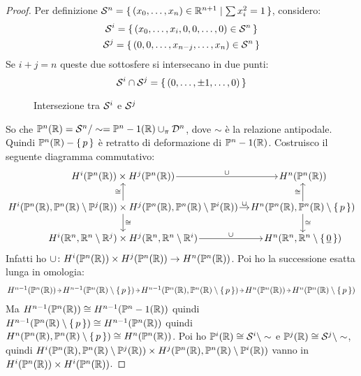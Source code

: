 \begin{proof}
  Per definizione $ \mathcal{S}^{n} = \set{(x_0, \dots, x_n) \in \mathbb{R}^{n+1} | \sum x_i^2 = 1} $,
  considero:
  \begin{gather*}
    \mathcal{S}^{i} = \set{(x_0, \dots, x_{i}, 0, 0, \dots, 0) \in \mathcal{S}^{n}} \\
    \mathcal{S}^{j} = \set{(0, 0, \dots, x_{n-j}, \dots, x_n) \in \mathcal{S}^{n}}
  \end{gather*}
  Se $ i + j = n $ queste due sottosfere si intersecano in due punti:
  \[
    \mathcal{S}^{i} \cap \mathcal{S}^{j} = \set{(0,\dots,\pm1,\dots,0)}
  \]
  \begin{figure}[htbp]
    \centering
    \caption{Intersezione tra $ \mathcal{S}^{i} $ e $ \mathcal{S}^{j} $}
    \label{fig:lez18:intersection}
  \end{figure}
  So che $ \mathbb{P}^n (\mathbb{R}) = \mathcal{S}^{n} \slash \sim = \mathbb{P}^n-1 (\mathbb{R}) \cup_\pi \mathcal{D}^{n} $, dove $ \sim $ è la
  relazione antipodale. Quindi $ \mathbb{P}^n (\mathbb{R}) - \set{p} $ è retratto di deformazione
  di $ \mathbb{P}^n-1 (\mathbb{R}) $.
  Costruisco il seguente diagramma commutativo:
  \[
    \begin{tikzcd}[nodes = {column sep = 10pt, outer sep = 0pt, inner sep = 1.5pt}]
      H^i(\Pjr{n}) \times H^j(\Pjr{n}) \rar{\cup} & H^n(\Pjr{n}) \\
      H^i(\Pjr{n}, \Pjr{n} \setminus \Pjr{j}) \times H^j(\Pjr{n}, \Pjr{n} \setminus \Pjr{i}) \uar{\cong} \rar{\cup} \dar{\cong} & H^n(\Pjr{n}, \Pjr{n} \setminus \set{p}) \dar{\cong} \uar{\cong} \\
      H^i(\RN{n}, \RN{n} \setminus \RN{j}) \times H^j(\RN{n}, \RN{n} \setminus \RN{i})  \rar{\cup} & H^n(\RN{n}, \RN{n} \setminus \set{\vec{0}})
    \end{tikzcd}
  \]
  Infatti ho $ \cup \colon H^i(\mathbb{P}^n (\mathbb{R})) \times H^j(\mathbb{P}^n (\mathbb{R})) \to H^n(\mathbb{P}^n (\mathbb{R})) $. Poi ho la successione
  esatta lunga in omologia:
  \[
    \begin{tikzcd}[nodes = {column sep = 5pt, inner sep = 1.5pt}]
      H^{n-1}(\Pjr{n}) \rar & H^{n-1}(\Pjr{n} \setminus \set{p}) \rar & H^{n-1}(\Pjr{n}, \Pjr{n} \setminus \set{p}) \rar & H^n(\Pjr{n}) \rar & H^n(\Pjr{n} \setminus \set{p})
    \end{tikzcd}
  \]
  Ma $ H^{n-1}(\mathbb{P}^n (\mathbb{R})) \cong H^{n-1}(\mathbb{P}^n-1 (\mathbb{R})) $ quindi $ H^{n-1}(\mathbb{P}^n (\mathbb{R}) \setminus \set{p}) \cong H^{n-1}(\mathbb{P}^n (\mathbb{R})) $
  quindi $ H^n(\mathbb{P}^n (\mathbb{R}), \mathbb{P}^n (\mathbb{R}) \setminus \set{p}) \cong H^n(\mathbb{P}^n (\mathbb{R})) $.
  Poi ho $ \mathbb{P}^i (\mathbb{R}) \cong \mathcal{S}^{i} \setminus \sim $ e $ \mathbb{P}^j (\mathbb{R}) \cong \mathcal{S}^{j} \setminus \sim $, quindi
  $ H^i(\mathbb{P}^n (\mathbb{R}), \mathbb{P}^n (\mathbb{R}) \setminus \mathbb{P}^j (\mathbb{R})) \times H^j(\mathbb{P}^n (\mathbb{R}), \mathbb{P}^n (\mathbb{R}) \setminus \mathbb{P}^i (\mathbb{R})) $ vanno
  in $ H^i(\mathbb{P}^n (\mathbb{R})) \times H^i(\mathbb{P}^n (\mathbb{R})) $.


\end{proof}
